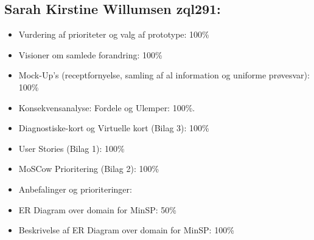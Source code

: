 \subsection{Sarah Kirstine Willumsen zql291:}
\begin{itemize}
\item Vurdering af prioriteter og valg af prototype: 100\% 
\item	 Visioner om samlede forandring: 100\%
\item	Mock-Up’s (receptfornyelse, samling af al information og uniforme prøvesvar): 100\%
\item	Konsekvensanalyse: Fordele og Ulemper: 100\%.
\item	Diagnostiske-kort og Virtuelle kort (Bilag 3): 100\%
\item	User Stories (Bilag 1): 100\%
\item	MoSCow Prioritering (Bilag 2): 100\%
\item	Anbefalinger og prioriteringer: 
\item	ER Diagram over domain for MinSP: 50\%
\item	Beskrivelse af ER Diagram over domain for MinSP: 100\%
\end{itemize}

